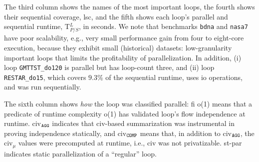 \documentclass[10pt,nocopyrightspace]{sigplanconf}
\begin{document}
The third column shows the names of the most important loops,
the fourth shows their sequential coverage, {\sc lsc}, and the
fifth shows each loop's parallel and sequential runtime, T$_{P/S}^L$, in seconds.
%
We note that benchmarks {\tt bdna} and {\tt nasa7} have poor scalability, e.g., very small
performance gain from four to eight-core execution, because they exhibit
small (historical) datasets: low-granularity important loops that limits the 
profitability of parallelization.
In addition, (i) loop {\tt GMTTST\_do120} 
is parallel but has loop-count three, and (ii) loop {\tt RESTAR\_do15},
which covers $9.3\%$ of the sequential runtime, uses {\sc io} operations,
and was run sequentially. 

The sixth column shows {\em how} the loop was classified parallel: {\sc fi} {\sc o(1)}
means that a predicate of runtime complexity {\sc o(1)} has validated loop's flow
independence at runtime. {\sc civ}$_{\tt{}AGG}$ indicates that {\sc civ}-based summarization 
was instrumental in proving independence statically, and {\sc civ}$_{\tt{}COMP}$ means that,
in addition to {\sc civ}$_{\tt{}AGG}$, the {\sc civ}$_\mu$ values were precomputed
at runtime, i.e., {\sc civ} was not privatizable.  {\sc st-par} indicates static
parallelization of a ``regular'' loop. 


\vspace{1ex}
\end{document}
